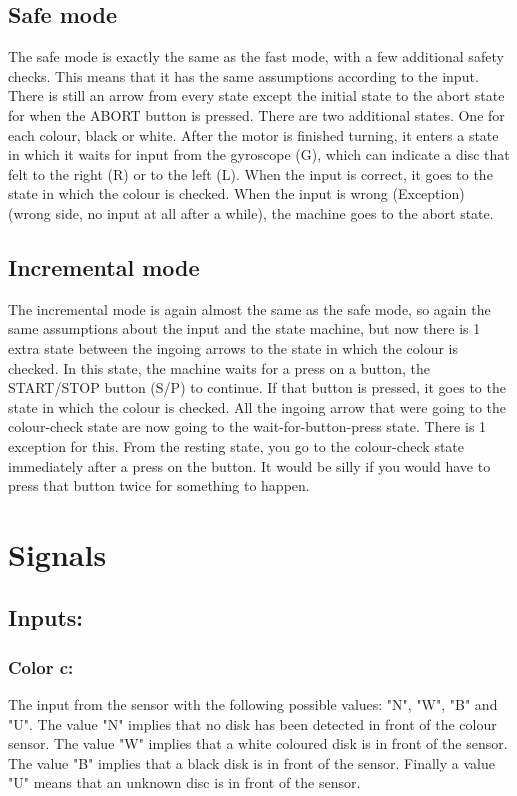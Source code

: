 \documentclass[a4paper,oneside,11pt]{article}
\begin{document}
\newpage

\subsection{Safe mode}
The safe mode is exactly the same as the fast mode, with a few additional safety checks. This means that it has the same assumptions according to the input. There is still an arrow from every state except the initial state to the abort state for when the ABORT button is pressed. There are two additional states. One for each colour, black or white. After the motor is finished turning, it enters a state in which it waits for input from the gyroscope (G), which can indicate a disc that felt to the right (R) or to the left (L). When the input is correct, it goes to the state in which the colour is checked. When the input is wrong (Exception) (wrong side, no input at all after a while), the machine goes to the abort state.
\subsection{Incremental mode}
The incremental mode is again almost the same as the safe mode, so again the same assumptions about the input and the state machine, but now there is 1 extra state between the ingoing arrows to the state in which the colour is checked. In this state, the machine waits for a press on a button, the START/STOP button (S/P) to continue. If that button is pressed, it goes to the state in which the colour is checked. All the ingoing arrow that were going to the colour-check state are now going to the wait-for-button-press state. There is 1 exception for this. From the resting state, you go to the colour-check state immediately after a press on the button. It would be silly if you would have to press that button twice for something to happen.

\section{Signals}
\subsection{Inputs:}
\subsubsection{Color c:} The input from the sensor with the following possible values: "N", "W", "B" and "U". The value "N" implies that no disk has been detected in front of the colour sensor. The value "W" implies that a white coloured disk is in front of the sensor. The value "B" implies that a black disk is in front of the sensor. Finally a value "U" means that an unknown disc is in front of the sensor.
\end{document}
